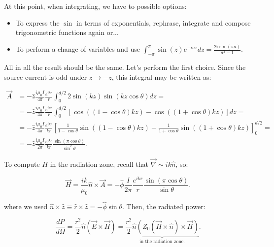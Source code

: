 At this point, when integrating, we have to possible options:

\begin{itemize}
	\item To express the $\sin$ in terms of exponentials, rephrase, integrate and compose trigonometric functions again or...
	\item To perform a change of variables and use $\int_{-\pi}^{\pi}\sin(z) e^{-iaz}dz= \tfrac{2i \sin(\pi a)}{a^{2}-1} $.
\end{itemize}

All in all the result should be the same. Let's perform the first choice. Since the source current is odd under $z \rightarrow-z$, this integral may be written as:

\begin{equation}
	\begin{split}
		\vec{A} &=-\hat{z} \frac{i \mu_{0} I}{4 \pi} \frac{e^{i k r}}{r} \int_{0}^{d / 2} 2 \sin (k z) \sin (k z \cos \theta) d z =\\
		&=-\hat{z} \frac{i \mu_{0} I}{4 \pi} \frac{e^{i k r}}{r} \int_{0}^{d / 2}[\cos ((1-\cos \theta) k z)-\cos ((1+\cos \theta) k z)] d z= \\
		&=-\hat{z} \frac{i \mu_{0} I}{4 \pi} \frac{e^{i k r}}{k r}\left[\frac{1}{1-\cos \theta} \sin ((1-\cos \theta) k z)-\frac{1}{1+\cos \theta} \sin ((1+\cos \theta) k z)\right]_{0}^{d / 2}= \\
		&=-\hat{z} \frac{i \mu_{0} I}{2 \pi} \frac{e^{i k r}}{k r} \frac{\sin (\pi \cos \theta)}{\sin ^{2} \theta}.
	\end{split}
\end{equation}

To compute $H$ in the radiation zone, recall that $\vec{\nabla} \sim i k \hat{n}$, so:

\begin{equation}
	\vec{H}=\frac{i k}{\mu_{0}} \hat{n} \times \vec{A}=-\hat{\phi} \frac{I}{2 \pi} \frac{e^{i k r}}{r} \frac{\sin (\pi \cos \theta)}{\sin \theta}.
\end{equation}

where we used $\hat{n} \times \hat{z} \equiv \hat{r} \times \hat{z}=-\hat{\phi} \sin \theta$.  Then, the radiated power:

\begin{equation}
	\frac{d P}{d \Omega}= \frac{r^{2}}{2} \hat{n} \left(\vec{E} \times \vec{H}\right) = \underbrace{\frac{r^{2}}{2} \hat{n} \left(Z_{0}(\vec{H}\times \hat{n})\times\vec{H}\right)}_{\text{in the radiation zone.}} .
\end{equation}

